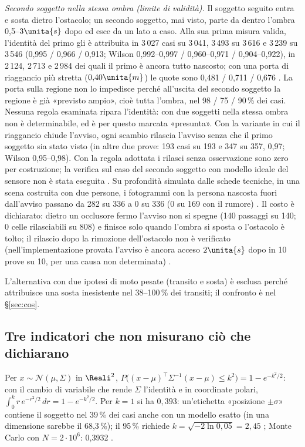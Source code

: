 \emph{Secondo soggetto nella stessa ombra (limite di validità).} Il soggetto seguito entra e sosta dietro l'ostacolo; un secondo soggetto, mai visto, parte da dentro l'ombra 0,5--$3\unita{s}$ dopo ed esce da un lato a caso. Alla sua prima misura valida, l'identità del primo gli è attribuita in 3\,027 casi su 3\,041, 3\,493 su 3\,616 e 3\,239 su 3\,546 (0,995 / 0,966 / 0,913; Wilson 0,992--0,997 / 0,960--0,971 / 0,904--0,922), in 2\,124, 2\,713 e 2\,984 dei quali il primo è ancora tutto nascosto; con una porta di riaggancio più stretta ($0{,}40\unita{m}$) le quote sono 0,481 / 0,711 / 0,676 . La porta sulla regione non lo impedisce perché all'uscita del secondo soggetto la regione è già «previsto ampio», cioè tutta l'ombra, nel 98 / 75 / 90\,\% dei casi. Nessuna regola esaminata ripara l'identità: con due soggetti nella stessa ombra non è determinabile, ed è per questo marcata «presunta». Con la variante in cui il riaggancio chiude l'avviso, ogni scambio rilascia l'avviso senza che il primo soggetto sia stato visto (in altre due prove: 193 casi su 193 e 347 su 357, 0,97; Wilson 0,95--0,98). Con la regola adottata i rilasci senza osservazione sono zero per costruzione; la verifica sul caso del secondo soggetto con modello ideale del sensore non è stata eseguita . Su profondità simulata dalle schede tecniche, in una scena costruita con due persone, i fotogrammi con la persona nascosta fuori dall'avviso passano da 282 su 336 a 0 su 336 (0 su 169 con il rumore) . Il costo è dichiarato: dietro un occlusore fermo l'avviso non si spegne (140 passaggi su 140; 0 celle rilasciabili su 808) e finisce solo quando l'ombra si sposta o l'ostacolo è tolto; il rilascio dopo la rimozione dell'ostacolo non è verificato (nell'implementazione provata l'avviso è ancora acceso $2\unita{s}$ dopo in 10 prove su 10, per una causa non determinata) .

L'alternativa con due ipotesi di moto pesate (transito e sosta) è esclusa perché attribuisce una sosta inesistente nel 38--100\,\% dei transiti; il confronto è nel \S\ref{sec:cos}.

\subsection{Tre indicatori che non misurano ciò che dichiarano}\label{sec:occ-indicatori}

\begin{osservazione}\label{oss:occ-sigma}
Per $x\sim\mathcal N(\mu,\Sigma)$ in $\Reali^2$, $P\bigl((x-\mu)^{\top}\Sigma^{-1}(x-\mu)\le k^2\bigr)=1-e^{-k^2/2}$: con il cambio di variabile che rende $\Sigma$ l'identità e in coordinate polari, $\int_0^k r\,e^{-r^2/2}\,dr=1-e^{-k^2/2}$. Per $k=1$ si ha $0{,}393$: un'etichetta «posizione $\pm\sigma$» contiene il soggetto nel 39\,\% dei casi anche con un modello esatto (in una dimensione sarebbe il 68,3\,\%); il 95\,\% richiede $k=\sqrt{-2\ln 0{,}05}=2{,}45$ ; Monte Carlo con $N=2\cdot10^6$: 0,3932 .
\end{osservazione}


